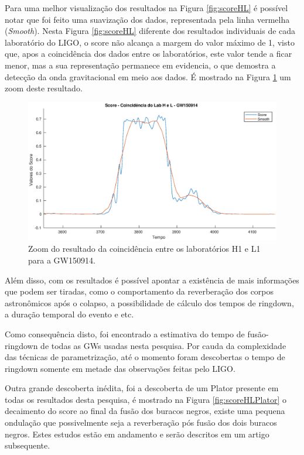 Para uma melhor visualização dos resultados na Figura \ref{fig:scoreHL} é possível notar que foi feito uma suavização dos dados, representada pela linha vermelha (\textit{Smooth}). Nesta Figura \ref{fig:scoreHL} diferente dos resultados individuais de cada laboratório do LIGO, o score não alcança a margem do valor máximo de 1, visto que, apos a coincidência dos dados entre os laboratórios, este valor tende a ficar menor, mas a sua representação permanece em evidencia, o que demostra a detecção da onda gravitacional em meio aos dados. É mostrado na Figura \ref{fig:scoreHLZoom} um zoom deste resultado.

\begin{figure}[H]
\centering
\includegraphics[width=1\textwidth]{figuras/GW150914_LabHL_zoom.eps}
\caption{Zoom do resultado da coincidência entre os laboratórios H1 e L1 para a GW150914.}
\label{fig:scoreHLZoom}
\end{figure}

Além disso, com os resultados é possível apontar a existência de mais informações que podem ser tiradas, como o comportamento da reverberação dos corpos astronômicos após o colapso, a possibilidade de cálculo dos tempos de ringdown, a duração temporal do evento e etc.

Como consequência disto, foi encontrado a estimativa do tempo de fusão-ringdown de todas as GWs usadas nesta pesquisa. Por cauda da complexidade das técnicas de parametrização, até o momento foram descobertas o tempo de ringdown somente em metade das observações feitas pelo LIGO.

Outra grande descoberta inédita, foi a descoberta de um Plator presente em todas os resultados desta pesquisa, é mostrado na Figura \ref{fig:scoreHLPlator} o decaimento do score ao final da fusão dos buracos negros, existe uma pequena ondulação que possivelmente seja a reverberação pós fusão dos dois buracos negros. Estes estudos estão em andamento e serão descritos em um artigo subsequente. 

